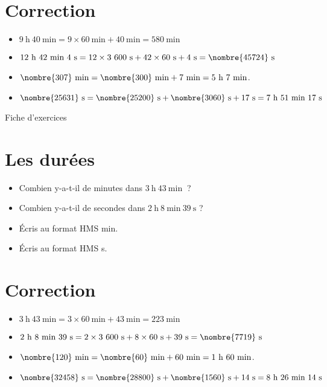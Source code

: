 \documentclass[a4paper,11pt,fleqn]{article}
\begin{document}
\section{Correction}
\begin{itemize}
 \item $9~\text{h}~40~\text{min}=9\times60~\text{min}+40~\text{min}=580~\text{min}$
  \item $12~\text{h}~42~\text{min}~4~\text{s}=12\times3~600~\text{s}+42\times60~\text{s}+4~\text{s}=\nombre{45724}~\text{s}$
  \item $\nombre{307}~\text{min}=\nombre{300}~\text{min}+7~\text{min}=5~\text{h}~7~\text{min}$.
  \item $\nombre{25631}~\text{s}=\nombre{25200}~\text{s}+\nombre{3060}~\text{s}+17~\text{s}=7~\text{h}~51~\text{min}~17~\text{s}$ \end{itemize}


\newpage
\setcounter{exo}{0}
\setcounter{section}{0}
\begin{center}
	{\huge Fiche d'exercices } 	
\end{center}


\section{Les durées}
\begin{itemize}
  \item Combien y-a-t-il de minutes dans $3~\text{h}~43~\text{min}~$ ?
  \item Combien y-a-t-il de secondes dans $2~\text{h}~8~\text{min}~39~\text{s}$ ?
  \item Écris au format HMS  min.
  \item Écris au format HMS  s.
\end{itemize}

\section{Correction}
\begin{itemize}
 \item $3~\text{h}~43~\text{min}=3\times60~\text{min}+43~\text{min}=223~\text{min}$
  \item $2~\text{h}~8~\text{min}~39~\text{s}=2\times3~600~\text{s}+8\times60~\text{s}+39~\text{s}=\nombre{7719}~\text{s}$
  \item $\nombre{120}~\text{min}=\nombre{60}~\text{min}+60~\text{min}=1~\text{h}~60~\text{min}$.
  \item $\nombre{32458}~\text{s}=\nombre{28800}~\text{s}+\nombre{1560}~\text{s}+14~\text{s}=8~\text{h}~26~\text{min}~14~\text{s}$ \end{itemize}
\end{document}
